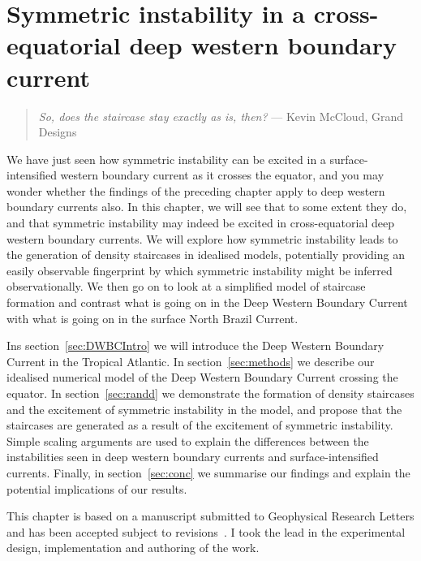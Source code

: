 \chapter{Symmetric instability in a cross-equatorial deep western boundary current}
\label{chap:4}
\begin{quote}
    \textit{So, does the staircase stay
    exactly as is, then?} --- Kevin McCloud, Grand Designs
\end{quote}

We have just seen how symmetric instability can be excited in a surface-intensified western boundary current as it crosses the equator, and you may wonder whether the findings of the preceding chapter apply to deep western boundary currents also. In this chapter, we will see that to some extent they do, and that symmetric instability may indeed be excited in cross-equatorial deep western boundary currents. We will explore how symmetric instability leads to the generation of density staircases in idealised models, potentially providing an easily observable fingerprint by which symmetric instability might be inferred observationally. We then go on to look at a simplified model of staircase formation and contrast what is going on in the Deep Western Boundary Current with what is going on in the surface North Brazil Current.

Ins section~\ref{sec:DWBCIntro} we will introduce the Deep Western Boundary Current in the Tropical Atlantic. In section~\ref{sec:methods} we describe our idealised numerical model of the Deep Western Boundary Current crossing the equator. In section~\ref{sec:randd} we demonstrate the formation of density staircases and the excitement of symmetric instability in the model, and propose that the staircases are generated as a result of the excitement of symmetric instability. Simple scaling arguments are used to explain the differences between the instabilities seen in deep western boundary currents and surface-intensified currents. Finally, in section~\ref{sec:conc} we summarise our findings and explain the potential implications of our results.

This chapter is based on a manuscript submitted to Geophysical Research Letters and has been accepted subject to revisions~\citep{Goldsworth2022}. I took the lead in the experimental design, implementation and authoring of the work.

